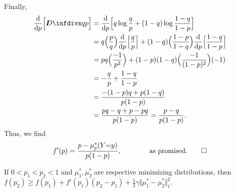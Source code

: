 \begin{lproof}
    Finally,
    \begin{align*}
        \frac{\mathrm d}{\mathrm d p} \Big[ \kldiv{q}{p} \Big]
        &= \frac{\mathrm d}{\mathrm d p}
            \Big[ q \log \frac{q}{p} + (1-q) \log \frac{1-q}{1-p} \Big] \\
        &= q \Big(\frac pq \Big) \frac{\mathrm d}{\mathrm d p} \Big[ \frac{q}{p}\Big]
            + (1-q)\Big(\frac{1-p}{1-q}\Big)  \frac{\mathrm d}{\mathrm d p} \Big[\frac{1-q}{1-p} \Big] \\
        &= pq \Big( \frac{-1}{p^2} \Big)
            + (1-p)(1-q) \Big( \frac{-1}{(1-p)^2} \Big)(-1) \\
        &= - \frac{q}{p}
            + \frac{1-q}{1-p} \\
        &= \frac{-(1-p)q + p(1-q)}{p(1-p)} \\
        &= \frac{pq - q + p - pq}{p(1-p)} 
        = \frac{p - q}{p(1-p)}.
    \end{align*}
    Thus, we find
    \[
        f'(p) = \frac{p - \mu^*_p(Y{=}y)}{p(1-p)},
        \qquad\qquad\text{as promised}. \qedhere
    \]
\end{lproof}
\begin{lemma} \label{lem:strongly-cvx-ish}
    If $0 < p_1 < p_2 < 1$
    and $\mu_1^*, \mu_2^*$ are respective minimizing distributions,
    then
    $
        f(p_2) \ge f(p_1) + f'(p_1) (p_2-p_1) +
            \frac 12\gamma
            \Vert \mu_1^* - \mu_2^* \Vert_1^2
            .
    $
\end{lemma}
